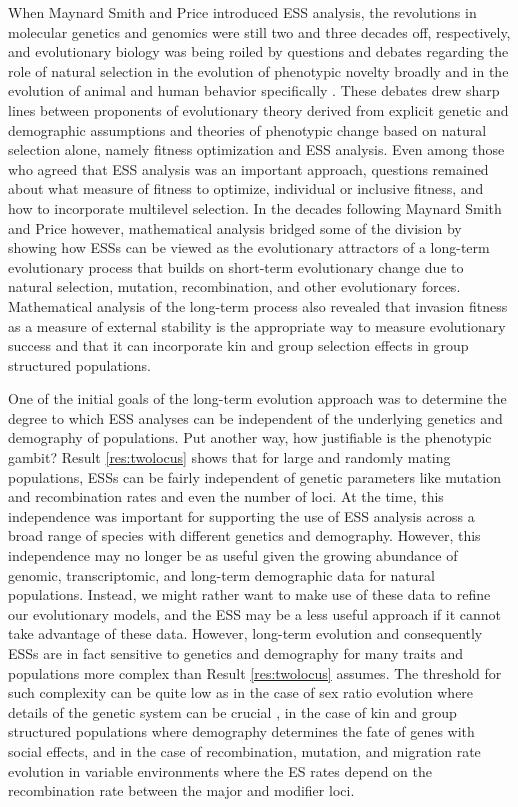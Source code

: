 \documentclass[11pt]{article}
\begin{document}
When Maynard Smith and Price \cite{Maynard-Smith:Price:1973,Maynard-Smith:1974} introduced ESS analysis, the revolutions in molecular genetics and genomics were still two and three decades off, respectively, and evolutionary biology was being roiled by questions and debates regarding the role of natural selection in the evolution of phenotypic novelty broadly \cite{Gould:Lewontin:1979} and in the evolution of animal and human behavior specifically \cite{Lewontin:1977,Hamilton:1977}. These debates drew sharp lines between proponents of evolutionary theory derived from explicit genetic and demographic assumptions and theories of phenotypic change based on natural selection alone, namely fitness optimization and ESS analysis. Even among those who agreed that ESS analysis was an important approach, questions remained about what measure of fitness to optimize, individual or inclusive fitness, and how to incorporate multilevel selection. In the decades following Maynard Smith and Price \cite{Maynard-Smith:Price:1973} however, mathematical analysis bridged some of the division by showing how ESSs can be viewed as the evolutionary attractors of a long-term evolutionary process that builds on short-term evolutionary change due to natural selection, mutation, recombination, and other evolutionary forces. Mathematical analysis of the long-term process also revealed that invasion fitness as a measure of external stability is the appropriate way to measure evolutionary success and that it can incorporate kin and group selection effects in group structured populations.

One of the initial goals of the long-term evolution approach was to determine the degree to which ESS analyses can be independent of the underlying genetics and demography of populations. Put another way, how justifiable is the phenotypic gambit? Result \ref{res:twolocus} shows that for large and randomly mating populations, ESSs can be fairly independent of genetic parameters like mutation and recombination rates and even the number of loci. At the time, this independence was important for supporting the use of ESS analysis across a broad range of species with different genetics and demography. However, this independence may no longer be as useful given the growing abundance of genomic, transcriptomic, and long-term demographic data for natural populations. Instead, we might rather want to make use of these data to refine our evolutionary models, and the ESS may be a less useful approach if it cannot take advantage of these data. However, long-term evolution and consequently ESSs are in fact sensitive to genetics and demography for many traits and populations more complex than Result \ref{res:twolocus} assumes. The threshold for such complexity can be quite low as in the case of sex ratio evolution where details of the genetic system can be crucial \cite{Hamilton:1967,Eshel:Feldman:1982a,Wu:1983,Taylor:Jaenike:2002}, in the case of kin and group structured populations where demography determines the fate of genes with social effects, and in the case of recombination, mutation, and migration rate evolution in variable environments where the ES rates depend on the recombination rate between the major and modifier loci.
\end{document}
